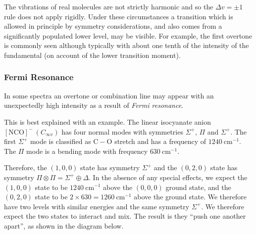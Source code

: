 \documentclass{article}
\theoremstyle{plain}\theoremheaderfont{\normalfont\itshape}\theorembodyfont{\rmfamily}\theoremseparator{.}\newtheorem*{rem}{Remark}\newtheorem*{ex}{Example}\newtheorem*{proof}{Proof}\newtheorem*{altp}{Alternative proof}
\theoremstyle{plain}\theoremheaderfont{\normalfont\bfseries}\theorembodyfont{\rmfamily}\theoremseparator{.}\newtheorem{thm}{Theorem}[section]\newtheorem{lem}[thm]{Lemma}\newtheorem{prop}[thm]{Proposition}\newtheorem*{cor}{Corollary}\newtheorem{defn}[thm]{Definition}\newtheorem{clm}[thm]{Claim}\newtheorem{clminproof}{Claim}\newtheorem{pos}{Postulate}[section]
\theoremstyle{break}\theoremheaderfont{\normalfont\itshape}\theorembodyfont{\rmfamily}\theoremseparator{.\medskip}\newtheorem*{proofskip}{Proof}\newtheorem*{exs}{Examples}\newtheorem*{rems}{Remarks}
\theoremstyle{break}\theoremheaderfont{\normalfont\bfseries}\theorembodyfont{\rmfamily}\theoremseparator{.\medskip}\newtheorem{lemskip}[thm]{Lemma}\newtheorem{defnskip}[thm]{Definition}\newtheorem{propskip}[thm]{Proposition}\newtheorem{thmskip}[thm]{Theorem}
\numberwithin{equation}{section}
\newcommand{\unit}[1]{\ \mathrm{#1}}
\newcommand{\ket}[1]{\left| #1 \right\rangle}
\begin{document}
    The vibrations of real molecules are not strictly harmonic and so the \(\Delta v=\pm 1\) rule does not apply rigidly. Under these circumstances a transition which is allowed in principle by symmetry considerations, and also comes from a significantly populated lower level, may be visible. For example, the first overtone is commonly seen although typically with about one tenth of the intensity of the fundamental (on account of the lower transition moment).
    
    \subsubsection{Fermi Resonance}
    In some spectra an overtone or combination line may appear with an unexpectedly high intensity as a result of \textit{Fermi resonance}.

    This is best explained with an example. The linear isocyanate anion \(\mathrm{[NCO]^-}\ (C_{\infty v})\) has four normal modes with symmetries \(\Sigma^+\), \(\Pi\) and \(\Sigma^+\). The first \(\Sigma^+\) mode is classified as \(\mathrm{C-O}\) stretch and has a frequency of \(1240\unit{cm}^{-1}\). The \(\Pi\) mode is a bending mode with frequency \(630\unit{cm}^{-1}\).

    Therefore, the \((1,0,0)\) state has symmetry \(\Sigma^+\) and the \((0,2,0)\) state has symmetry \(\Pi\otimes\Pi=\Sigma^+\oplus\Delta\). In the absence of any special effects, we expect the \((1,0,0)\) state to be \(1240\unit{cm}^{-1}\) above the \((0,0,0)\) ground state, and the \((0,2,0)\) state to be \(2\times 630=1260\unit{cm}^{-1}\) above the ground state. We therefore have two levels with similar energies and the same symmetry \(\Sigma^+\). We therefore expect the two states to interact and mix. The result is they ``push one another apart'', as shown in the diagram below.
    \begin{figure}[ht!]
        \centering
    \end{figure}
\end{document}
